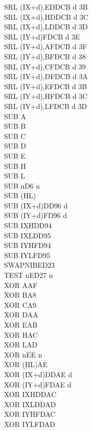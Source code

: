 \begin{multicols}{3}
{\begin{tabbing}
        SRL (IX+d),E\UNDOC\>DDCB d 3B\\
        SRL (IX+d),H\UNDOC\>DDCB d 3C\\
        SRL (IX+d),L\UNDOC\>DDCB d 3D\\
        SRL (IY+d)\>FDCB d 3E\\
        SRL (IY+d),A\UNDOC\>FDCB d 3F\\
        SRL (IY+d),B\UNDOC\>FDCB d 38\\
        SRL (IY+d),C\UNDOC\>FDCB d 39\\
        SRL (IY+d),D\UNDOC\>FDCB d 3A\\
        SRL (IY+d),E\UNDOC\>FDCB d 3B\\
        SRL (IY+d),H\UNDOC\>FDCB d 3C\\
        SRL (IY+d),L\UNDOC\>FDCB d 3D\\
        SUB A\\
        SUB B\\
        SUB C\\
        SUB D\\
        SUB E\\
        SUB H\\
        SUB L\\
        SUB n\>D6 n\\
        SUB (HL)\\
        SUB (IX+d)\>DD96 d\\
        SUB (IY+d)\>FD96 d\\
        SUB IXH\UNDOC\>DD94\\
        SUB IXL\UNDOC\>DD95\\
        SUB IYH\UNDOC\>FD94\\
        SUB IYL\UNDOC\>FD95\\
        SWAPNIB\ZXN\>ED23\\
        TEST n\ZXN\>ED27 n\\
        XOR A\>AF\\
        XOR B\>A8\\
        XOR C\>A9\\
        XOR D\>AA\\
        XOR E\>AB\\
        XOR H\>AC\\
        XOR L\>AD\\
        XOR n\>EE n\\
        XOR (HL)\>AE\\
        XOR (IX+d)\>DDAE d\\
        XOR (IY+d)\>FDAE d\\
        XOR IXH\UNDOC\>DDAC\\
        XOR IXL\UNDOC\>DDAD\\
        XOR IYH\UNDOC\>FDAC\\
        XOR IYL\UNDOC\>FDAD

    \end{tabbing}
}
\end{multicols}
\normalsize


\pagebreak
\IntentionallyEmpty
\pagebreak
